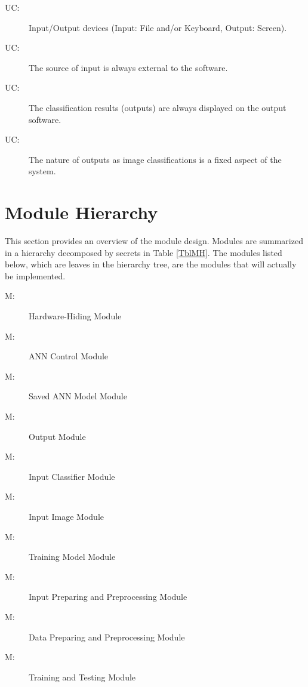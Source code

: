 \documentclass[12pt, titlepage]{article}
\newcounter{ucnum}
\newcommand{\uctheucnum}{UC\theucnum}
\newcounter{mnum}
\newcommand{\mthemnum}{M\themnum}
\begin{document}
\begin{description}
\item[ \uctheucnum \label{ucIO}:] Input/Output devices
  (Input: File and/or Keyboard, Output: Screen).
\item[ \uctheucnum \label{ucIO}:] The source of input 
  is always external to the software.
\item[ \uctheucnum \label{ucIO}:] The classification results
 (outputs) are always displayed on the output software.
\item[ \uctheucnum \label{ucIO}:] The nature of outputs as 
image classifications is a fixed aspect of the system.
\end{description}

\section{Module Hierarchy} \label{SecMH}

This section provides an overview of the module design. Modules are summarized
in a hierarchy decomposed by secrets in Table \ref{TblMH}. The modules listed
below, which are leaves in the hierarchy tree, are the modules that will
actually be implemented.

\begin{description}
\item [ \mthemnum \label{HW}:] Hardware-Hiding Module
\item [ \mthemnum \label{ACM}:] ANN Control Module
\item [ \mthemnum \label{SavedANN}:] Saved ANN Model Module
\item [ \mthemnum \label{Output}:] Output Module
\item [ \mthemnum \label{In-class}:] Input Classifier Module
\item [ \mthemnum \label{In-set}:] Input Image Module
\item [ \mthemnum \label{Train-Model}:] Training Model Module
\item [ \mthemnum \label{In-prep}:] Input Preparing and Preprocessing Module
\item [ \mthemnum \label{Data}:] Data Preparing and Preprocessing Module
\item [ \mthemnum \label{Train}:] Training and Testing Module
\end{description}
\end{document}
